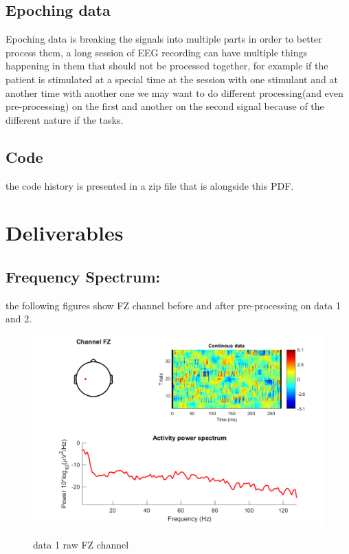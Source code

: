 \documentclass[11pt]{article}
\begin{document}
\subsection{Epoching data}
Epoching data is breaking the signals into multiple parts in order to better process them,
a long session of EEG recording can have multiple things happening in them that
should not be processed together, for example if the patient is stimulated at a special
time at the session with one stimulant and at another time with another one we may
want to do different processing(and even pre-processing) on the first and another on
the second signal because of the different nature if the tasks. \\


\subsection{Code}
the code history is presented in a zip file that is alongside this PDF.


\section{Deliverables}
\subsection*{Frequency Spectrum:}
the following figures show FZ channel before and after pre-processing on data 1 and 2. \\
\begin{figure}[H]
    \begin{center}
        \includegraphics[scale=0.7]{Fig/Fz_spectra_raw_data1.png}
        \label{fig:fzRaw1}
        \caption{data 1 raw FZ channel}
    \end{center}
\end{figure}
\end{document}
